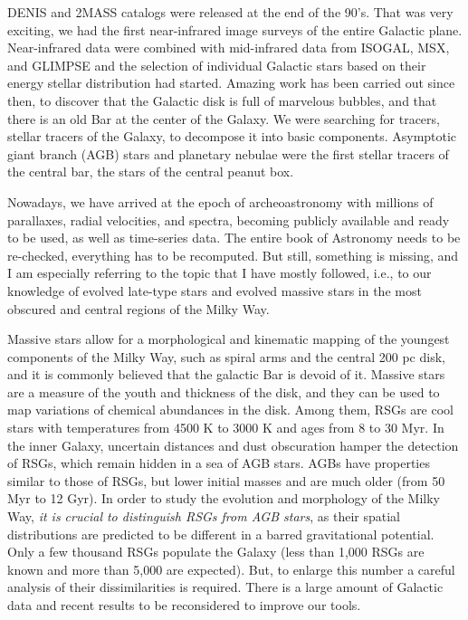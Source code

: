 \documentclass[final,11pt,onecolumn,a4paper,twoside]{scrbook_gj}
\begin{document}
DENIS and 2MASS catalogs  were released at the end of the 90's. 
That was very exciting, we had the first 
near-infrared image surveys of the entire Galactic plane.
Near-infrared data were combined with mid-infrared data from
ISOGAL, MSX, and GLIMPSE and the selection of individual Galactic 
stars based on their energy stellar distribution had started.
Amazing work has been carried out since then,
to discover that the Galactic disk is full of marvelous bubbles,
and that there is an old Bar at the center of the Galaxy.
We were searching for tracers, stellar tracers of the Galaxy,
to decompose it into basic components.
Asymptotic giant branch (AGB) stars and planetary nebulae were
the first stellar tracers of the central bar, the
stars of the central peanut box.

Nowadays, we have arrived at the epoch of archeoastronomy 
with millions of parallaxes, radial velocities, and spectra, 
becoming publicly available and  
ready to be used, as well as   time-series data.
The entire book of Astronomy needs
to be re-checked, everything has to be recomputed.
But still, something is missing, and
I am especially referring to the topic that
I have mostly followed, i.e., to
our knowledge of evolved late-type stars
and evolved massive stars in the most obscured
and central regions of the Milky Way.


Massive stars allow for a morphological and kinematic 
mapping of the youngest components of the Milky Way, 
such as spiral arms and the central 200 pc disk, and
it is commonly believed that the galactic Bar is 
devoid of it.  
Massive stars are a measure of the youth and 
thickness of the disk, and they can be used to map 
variations of chemical abundances in the disk. 
Among them, RSGs are cool stars 
with temperatures from 4500 K to 3000 K and 
ages from 8 to 30 Myr. 
In the inner Galaxy, uncertain distances and 
dust obscuration  hamper 
the detection of  RSGs, which remain hidden 
in a sea of AGB stars. AGBs have   properties similar
to those of RSGs, 
but lower initial masses and are much older 
(from  50 Myr to 12 Gyr). 
In order to study the  evolution and morphology 
of the Milky Way, {\it it is crucial to distinguish 
RSGs from AGB stars}, as  their spatial distributions
are predicted to be different in a barred gravitational
potential. Only a few thousand RSGs  
populate the Galaxy (less than 1,000 RSGs are known 
 and more than 5,000 are expected). 
But,  to enlarge this number a careful 
analysis of their   dissimilarities is required.
There is a large amount of Galactic data and  recent results  
to be reconsidered to improve our  tools.
\end{document}

